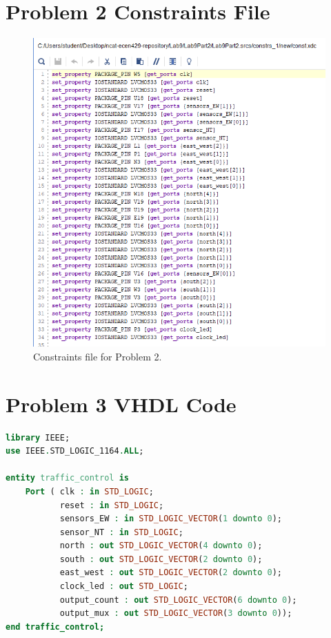 \documentclass[11pt]{article}
\begin{document}
\begin{appendices}
\section{Problem 2 Constraints File}
\begin{center}
\begin{figure}[H]
	\includegraphics[scale=1]{./images/Part2/l9p2const.png}
	\caption{\label{fig:Prob2Const}Constraints file for Problem 2.}
\end{figure}
\end{center}

\section{Problem 3 VHDL Code}
\begin{lstlisting}[language=VHDL]
library IEEE;
use IEEE.STD_LOGIC_1164.ALL;

entity traffic_control is
    Port ( clk : in STD_LOGIC;
           reset : in STD_LOGIC;
           sensors_EW : in STD_LOGIC_VECTOR(1 downto 0);
           sensor_NT : in STD_LOGIC;
           north : out STD_LOGIC_VECTOR(4 downto 0);
           south : out STD_LOGIC_VECTOR(2 downto 0);
           east_west : out STD_LOGIC_VECTOR(2 downto 0);
           clock_led : out STD_LOGIC;
           output_count : out STD_LOGIC_VECTOR(6 downto 0);
           output_mux : out STD_LOGIC_VECTOR(3 downto 0));
end traffic_control;


\end{lstlisting}
\end{appendices}
\end{document}
